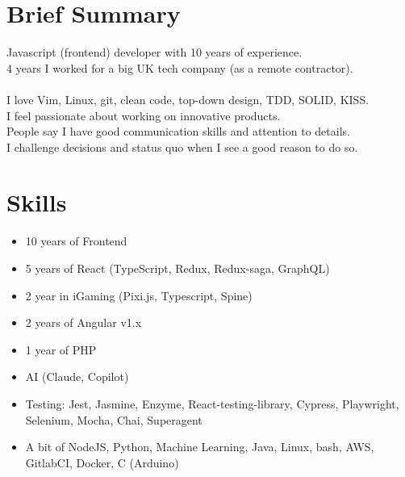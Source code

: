 \documentclass[a4paper, 14pt]{article}
\begin{document}
\begin{center}
	\textsc{\Huge{}}
\end{center}


\section{Brief Summary}
  Javascript (frontend) developer with 10 years of experience.  \\
  4 years I worked for a big UK tech company (as a remote contractor). \\
  \\
  I love Vim, Linux, git, clean code, top-down design, TDD, SOLID, KISS. \\
  I feel passionate about working on innovative products. \\
  People say I have good communication skills and attention to details. \\
  I challenge decisions and status quo when I see a good reason to do so.

\section{Skills}
  \begin{itemize}
    \item 10 years of Frontend  \\
    \item 5 years of React (TypeScript, Redux, Redux-saga, GraphQL) \\
    \item 2 year in iGaming (Pixi.js, Typescript, Spine) \\
    \item 2 years of Angular v1.x \\ 
    \item 1 year of PHP \\
    \item AI (Claude, Copilot) \\
    \item Testing: Jest, Jasmine, Enzyme, React-testing-library, Cypress, Playwright, Selenium, Mocha, Chai, Superagent \\
    \item A bit of NodeJS, Python, Machine Learning, Java, Linux, bash, AWS, GitlabCI, Docker, C (Arduino)
  \end{itemize}
\end{document}
